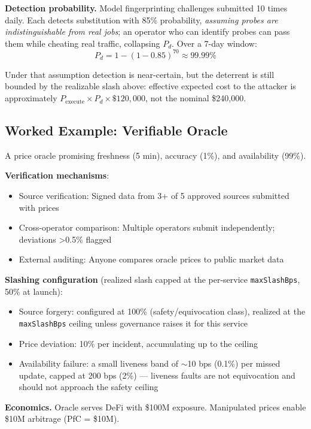 \documentclass[11pt,a4paper]{article}
\begin{document}
\textbf{Detection probability.} Model fingerprinting challenges submitted 10 times daily. Each detects substitution with 85\% probability, \emph{assuming probes are indistinguishable from real jobs}; an operator who can identify probes can pass them while cheating real traffic, collapsing $P_d$. Over a 7-day window:
\[
P_d = 1 - (1 - 0.85)^{70} \approx 99.99\%
\]

Under that assumption detection is near-certain, but the deterrent is still bounded by the realizable slash above: effective expected cost to the attacker is approximately $P_{\text{execute}} \times P_d \times \$120,000$, not the nominal \$240,000.

\subsection{Worked Example: Verifiable Oracle}

A price oracle promising freshness (5 min), accuracy (1\%), and availability (99\%).

\textbf{Verification mechanisms}:
\begin{itemize}[noitemsep]
    \item Source verification: Signed data from 3+ of 5 approved sources submitted with prices
    \item Cross-operator comparison: Multiple operators submit independently; deviations >0.5\% flagged
    \item External auditing: Anyone compares oracle prices to public market data
\end{itemize}

\textbf{Slashing configuration} (realized slash capped at the per-service \texttt{maxSlashBps}, 50\% at launch):
\begin{itemize}[noitemsep]
    \item Source forgery: configured at 100\% (safety/equivocation class), realized at the \texttt{maxSlashBps} ceiling unless governance raises it for this service
    \item Price deviation: 10\% per incident, accumulating up to the ceiling
    \item Availability failure: a small liveness band of $\sim$10 bps (0.1\%) per missed update, capped at 200 bps (2\%) --- liveness faults are not equivocation and should not approach the safety ceiling
\end{itemize}

\textbf{Economics.} Oracle serves DeFi with \$100M exposure. Manipulated prices enable \$10M arbitrage (PfC = \$10M).
\end{document}

